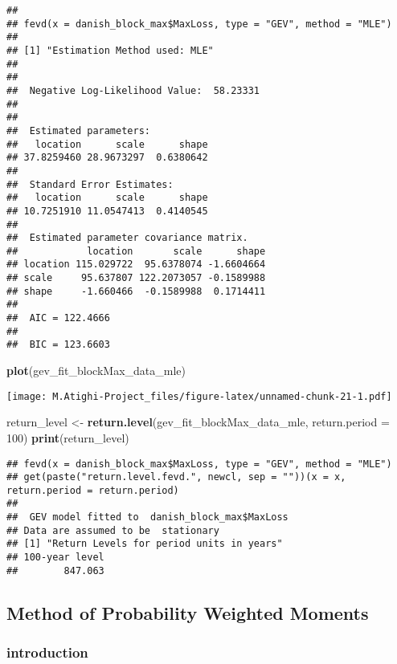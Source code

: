 \documentclass[
  12pt,
]{article}
\newenvironment{Shaded}{\begin{snugshade}}{\end{snugshade}}
\newcommand{\AttributeTok}[1]{\textcolor[rgb]{0.13,0.29,0.53}{#1}}
\newcommand{\DecValTok}[1]{\textcolor[rgb]{0.00,0.00,0.81}{#1}}
\newcommand{\FunctionTok}[1]{\textcolor[rgb]{0.13,0.29,0.53}{\textbf{#1}}}
\newcommand{\NormalTok}[1]{#1}
\newcommand{\OtherTok}[1]{\textcolor[rgb]{0.56,0.35,0.01}{#1}}
\begin{document}
\begin{verbatim}
## 
## fevd(x = danish_block_max$MaxLoss, type = "GEV", method = "MLE")
## 
## [1] "Estimation Method used: MLE"
## 
## 
##  Negative Log-Likelihood Value:  58.23331 
## 
## 
##  Estimated parameters:
##   location      scale      shape 
## 37.8259460 28.9673297  0.6380642 
## 
##  Standard Error Estimates:
##   location      scale      shape 
## 10.7251910 11.0547413  0.4140545 
## 
##  Estimated parameter covariance matrix.
##            location       scale      shape
## location 115.029722  95.6378074 -1.6604664
## scale     95.637807 122.2073057 -0.1589988
## shape     -1.660466  -0.1589988  0.1714411
## 
##  AIC = 122.4666 
## 
##  BIC = 123.6603
\end{verbatim}

\begin{Shaded}
\begin{Highlighting}[]
\FunctionTok{plot}\NormalTok{(gev\_fit\_blockMax\_data\_mle)}
\end{Highlighting}
\end{Shaded}

\texttt{[image: M.Atighi-Project\_files/figure-latex/unnamed-chunk-21-1.pdf]}

\begin{Shaded}
\begin{Highlighting}[]
\NormalTok{return\_level }\OtherTok{\textless{}{-}} \FunctionTok{return.level}\NormalTok{(gev\_fit\_blockMax\_data\_mle, }\AttributeTok{return.period =} \DecValTok{100}\NormalTok{)}
\FunctionTok{print}\NormalTok{(return\_level)}
\end{Highlighting}
\end{Shaded}

\begin{verbatim}
## fevd(x = danish_block_max$MaxLoss, type = "GEV", method = "MLE")
## get(paste("return.level.fevd.", newcl, sep = ""))(x = x, return.period = return.period)
## 
##  GEV model fitted to  danish_block_max$MaxLoss  
## Data are assumed to be  stationary 
## [1] "Return Levels for period units in years"
## 100-year level 
##        847.063
\end{verbatim}

\subsection{Method of Probability Weighted
Moments}\label{method-of-probability-weighted-moments}

\subsubsection{introduction}\label{introduction-3}
\end{document}
